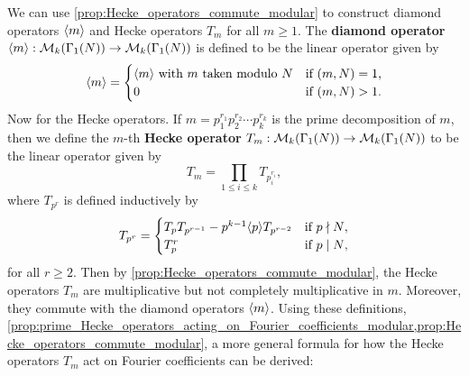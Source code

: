       We can use \cref{prop:Hecke_operators_commute_modular} to construct diamond operators $\langle m\rangle$ and Hecke operators $T_{m}$ for all $m \ge 1$. The \textbf{diamond operator} $\langle m\rangle:\mathcal{M}_{k}(\Gamma_{1}(N)) \to \mathcal{M}_{k}(\Gamma_{1}(N))$ is defined to be the linear operator given by
      \[
        \langle m\rangle = \begin{cases} \langle m\rangle \text{ with $m$ taken modulo $N$} & \text{if $(m,N) = 1$,} \\ 0 & \text{if $(m,N) > 1$.} \end{cases}
      \]
      Now for the Hecke operators. If $m = p_{1}^{r_{1}}p_{2}^{r_{2}} \cdots p_{k}^{r_{k}}$ is the prime decomposition of $m$, then we define the $m$-th \textbf{Hecke operator} $T_{m}:\mathcal{M}_{k}(\Gamma_{1}(N)) \to \mathcal{M}_{k}(\Gamma_{1}(N))$ to be the linear operator given by
      \[
        T_{m} = \prod_{1 \le i \le k}T_{p_{i}^{r_{i}}},
      \]
      where $T_{p^{r}}$ is defined inductively by
      \[
        T_{p^{r}} = \begin{cases} T_{p}T_{p^{r-1}}-p^{k-1}\langle p\rangle T_{p^{r-2}} & \text{if $p \nmid N$}, \\ T_{p}^{r} & \text{if $p \mid N$}, \end{cases}
      \]
      for all $r \ge 2$. Then by \cref{prop:Hecke_operators_commute_modular}, the Hecke operators $T_{m}$ are multiplicative but not completely multiplicative in $m$. Moreover, they commute with the diamond operators $\langle m\rangle$. Using these definitions, \cref{prop:prime_Hecke_operators_acting_on_Fourier_coefficients_modular,prop:Hecke_operators_commute_modular}, a more general formula for how the Hecke operators $T_{m}$ act on Fourier coefficients can be derived:

